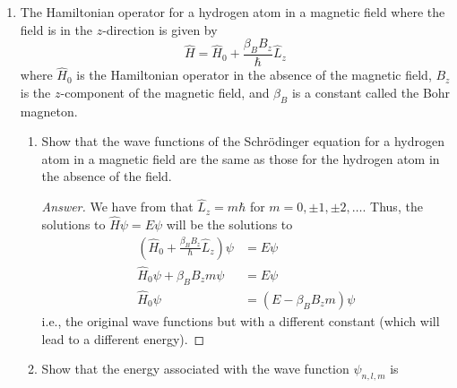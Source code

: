 \documentclass[../psets.tex]{subfiles}
\begin{document}
\begin{enumerate}
\begin{proof}[Answer]
\begin{align*}
            \mu_{\ce{H}} &= \frac{m_em_p}{m_e+m_p}&
                \mu_{\ce{T}} &= \frac{m_e(3m_p)}{m_3+3m_p}\\
            &= \SI{9.11e-31}{\kilo\gram}&
                &= \SI{9.12e-31}{\kilo\gram}
        \end{align*}
        Therefore, we have that
        \begin{align*}
            \frac{E_{1_{\ce{H}}}}{E_{1_{\ce{T}}}} &= \frac{-\frac{\mu_{\ce{H}}e^4}{8h^2\epsilon_0^2}}{-\frac{\mu_{\ce{T}}e^4}{8h^2\epsilon_0^2}}\\
            &= \frac{\mu_{\ce{H}}}{\mu_{\ce{T}}}\\
            \Aboxed{E_{1_{\ce{H}}}:E_{1_{\ce{T}}} &= 0.999}
        \end{align*}
    \end{proof}
    \item The Hamiltonian operator for a hydrogen atom in a magnetic field where the field is in the $z$-direction is given by
    \begin{equation*}
        \hat{H} = \hat{H}_0+\frac{\beta_BB_z}{\hbar}\hat{L}_z
    \end{equation*}
    where $\hat{H}_0$ is the Hamiltonian operator in the absence of the magnetic field, $B_z$ is the $z$-component of the magnetic field, and $\beta_B$ is a constant called the Bohr magneton.
    \begin{enumerate}
        \item Show that the wave functions of the Schr\"{o}dinger equation for a hydrogen atom in a magnetic field are the same as those for the hydrogen atom in the absence of the field.
        \begin{proof}[Answer]
            We have from \textcite[201]{bib:McQuarrieSimon} that $\hat{L}_z=m\hbar$ for $m=0,\pm 1,\pm 2,\dots$. Thus, the solutions to $\hat{H}\psi=E\psi$ will be the solutions to
            \begin{align*}
                \left( \hat{H}_0+\frac{\beta_BB_z}{\hbar}\hat{L}_z \right)\psi &= E\psi\\
                \hat{H}_0\psi+\beta_BB_zm\psi &= E\psi\\
                \hat{H}_0\psi &= (E-\beta_BB_zm)\psi
            \end{align*}
            i.e., the original wave functions but with a different constant (which will lead to a different energy).
        \end{proof}
        \item Show that the energy associated with the wave function $\psi_{n,l,m}$ is

\end{enumerate}
\end{enumerate}
\end{document}

